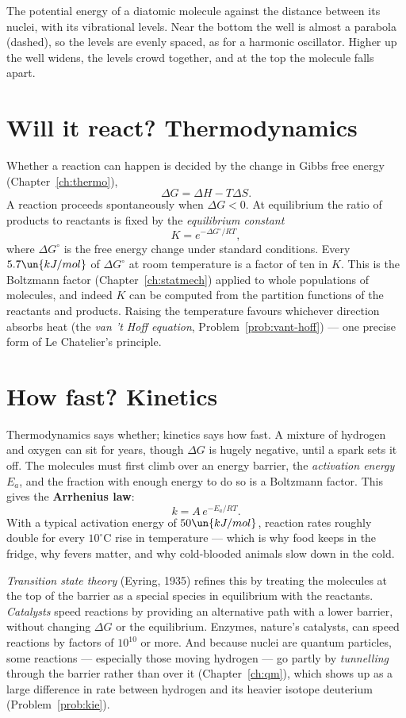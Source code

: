 \begin{center}
\begin{minipage}{\linewidth}
{\small The potential energy of a diatomic molecule against the distance between its nuclei, with its vibrational levels. Near the bottom the well is almost a parabola (dashed), so the levels are evenly spaced, as for a harmonic oscillator. Higher up the well widens, the levels crowd together, and at the top the molecule falls apart.}
\end{minipage}
\end{center}

\section{Will it react? Thermodynamics}

Whether a reaction can happen is decided by the change in Gibbs free energy (Chapter~\ref{ch:thermo}),
\[
  \Delta G = \Delta H - T\Delta S .
\]
A reaction proceeds spontaneously when $\Delta G<0$. At equilibrium the ratio of products to reactants is fixed by the \emph{equilibrium constant}
\[
  K = e^{-\Delta G^\circ/RT},
\]
where $\Delta G^\circ$ is the free energy change under standard conditions. Every $5.7\un{kJ/mol}$ of $\Delta G^\circ$ at room temperature is a factor of ten in $K$. This is the Boltzmann factor (Chapter~\ref{ch:statmech}) applied to whole populations of molecules, and indeed $K$ can be computed from the partition functions of the reactants and products. Raising the temperature favours whichever direction absorbs heat (the \emph{van 't Hoff equation}, Problem~\ref{prob:vant-hoff}) --- one precise form of Le Chatelier's principle.

\section{How fast? Kinetics}

Thermodynamics says whether; kinetics says how fast. A mixture of hydrogen and oxygen can sit for years, though $\Delta G$ is hugely negative, until a spark sets it off. The molecules must first climb over an energy barrier, the \emph{activation energy} $E_a$, and the fraction with enough energy to do so is a Boltzmann factor. This gives the \textbf{Arrhenius law}:
\[
  k = A\,e^{-E_a/RT}.
\]
With a typical activation energy of $50\un{kJ/mol}$, reaction rates roughly double for every $10^\circ\text{C}$ rise in temperature --- which is why food keeps in the fridge, why fevers matter, and why cold-blooded animals slow down in the cold.

\emph{Transition state theory} (Eyring, 1935) refines this by treating the molecules at the top of the barrier as a special species in equilibrium with the reactants. \emph{Catalysts} speed reactions by providing an alternative path with a lower barrier, without changing $\Delta G$ or the equilibrium. Enzymes, nature's catalysts, can speed reactions by factors of $10^{10}$ or more. And because nuclei are quantum particles, some reactions --- especially those moving hydrogen --- go partly by \emph{tunnelling} through the barrier rather than over it (Chapter~\ref{ch:qm}), which shows up as a large difference in rate between hydrogen and its heavier isotope deuterium (Problem~\ref{prob:kie}).

